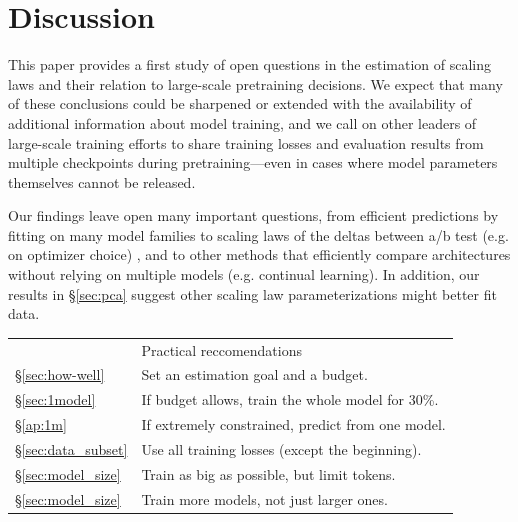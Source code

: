 \documentclass{article}
\theoremstyle{plain}
\theoremstyle{definition}
\theoremstyle{remark}
\begin{document}
\section{Discussion}
This paper provides a first study of open questions in the estimation of scaling laws and their relation to large-scale pretraining decisions. 
We expect that many of these conclusions could be sharpened or extended with the availability of additional information about model training, and we call on other leaders of large-scale training efforts to share
training losses and evaluation results from multiple checkpoints during pretraining---even in cases where model parameters themselves cannot be released. 

Our findings leave open many important questions, from %
efficient predictions by fitting on many model families to scaling laws of the deltas between a/b test (e.g. on optimizer choice)%
, and to other methods that efficiently compare architectures without relying on multiple models (e.g. continual learning). In addition, our results in \S\ref{sec:pca} suggest other scaling law parameterizations might better fit data. 

\begin{tabular}{ll}
    \rowcolor{olive!50}
     & Practical reccomendations\\
    \S\ref{sec:how-well} & Set an estimation goal and a budget. \\
    \S\ref{sec:1model} & If budget allows, train the whole model for 30\%. \\
    \S\ref{ap:1m} & If extremely constrained, predict from one model. \\
    \S\ref{sec:data_subset}  & Use all training losses (except the beginning). \\
    \S\ref{sec:model_size}  & Train as big as possible, but limit tokens. \\
    \S\ref{sec:model_size}  & Train more models, not just larger ones. \\
  \end{tabular}
\end{document}
